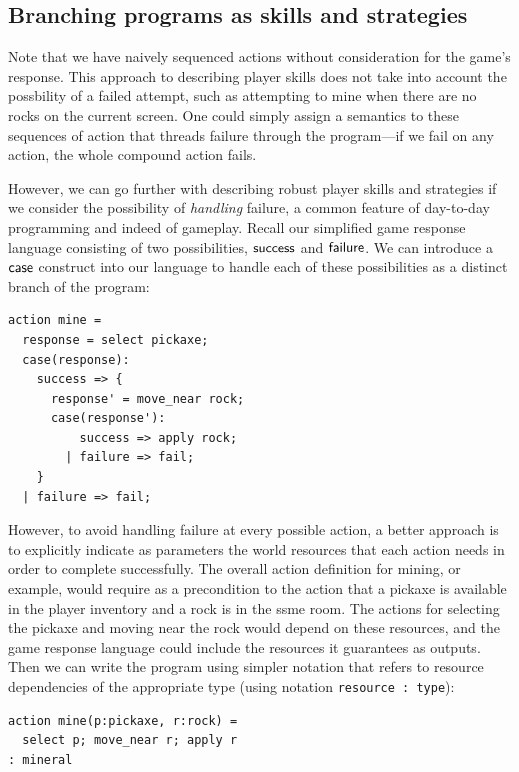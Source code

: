 \subsection{Branching programs as skills and strategies}

Note that we have naively sequenced actions without consideration for the
game's response. This approach to describing player skills does not take
into account the possbility of a failed attempt, such as attempting to mine
when there are no rocks on the current screen. One could simply assign a
semantics to these sequences of action that threads failure through the
program---if we fail on any action, the whole compound action fails.

However, we can go further with describing robust player skills and
strategies if we consider the possibility of {\em handling} failure, a
common feature of day-to-day programming and indeed of gameplay. Recall our
simplified game response language consisting of two possibilities,
$\mathsf{success}$ and $\mathsf{failure}$. We can introduce a $\mathsf{case}$
construct into our language to handle each of these possibilities as a
distinct branch of the program:
%
\begin{verbatim}
action mine = 
  response = select pickaxe;
  case(response):
    success => {
      response' = move_near rock;
      case(response'):
          success => apply rock;
        | failure => fail;
    }
  | failure => fail;
\end{verbatim}
%
However, to avoid handling failure at every possible action, a better
approach is to explicitly indicate as parameters the world resources that
each action needs in order to complete successfully.
The overall action definition for mining, or example, would
require as a precondition to the action that a pickaxe is
available in the player inventory and a rock is in the ssme room. The
actions for selecting the pickaxe and moving near the rock would depend on
these resources, and the game response language could include the resources
it guarantees as outputs. Then we can write the program using simpler
notation that refers to resource dependencies of the appropriate type
(using notation \verb|resource : type|):
%
\begin{verbatim}
action mine(p:pickaxe, r:rock) = 
  select p; move_near r; apply r
: mineral
\end{verbatim}
%

